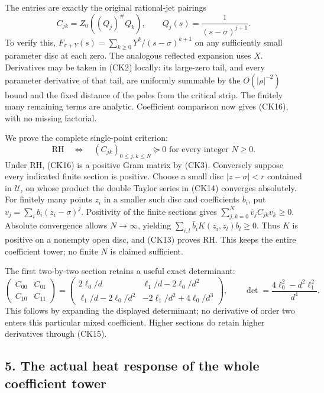 \documentclass[
  10pt,
  a4paper,
]{article}
\newcounter{none} %
\begin{document}
The entries are exactly the original rational-jet pairings \[
C_{jk}=Z_0\!\left((Q_j)^\#Q_k\right),\qquad
Q_j(s)=\frac1{(s-\sigma)^{j+1}}.
\tag{CK16}
\] To verify this, \(F_{\sigma+Y}(s)=\sum_{k\ge0}Y^k/(s-\sigma)^{k+1}\)
on any sufficiently small parameter disc at each zero. The analogous
reflected expansion uses \(X\). Derivatives may be taken in (CK2)
locally: its large-zero tail, and every parameter derivative of that
tail, are uniformly summable by the \(O(|\rho|^{-2})\) bound and the
fixed distance of the poles from the critical strip. The finitely many
remaining terms are analytic. Coefficient comparison now gives (CK16),
with no missing factorial.

We prove the complete single-point criterion: \[
\boxed{\mathrm{RH}\quad\Longleftrightarrow\quad
(C_{jk})_{0\le j,k\le N}\succeq0\text{ for every integer }N\ge0.}
\tag{CK17}
\] Under RH, (CK16) is a positive Gram matrix by (CK3). Conversely
suppose every indicated finite section is positive. Choose a small disc
\(|z-\sigma|<r\) contained in \(\mathcal U\), on whose product the
double Taylor series in (CK14) converges absolutely. For finitely many
points \(z_i\) in a smaller such disc and coefficients \(b_i\), put
\(v_j=\sum_i b_i(z_i-\sigma)^j\). Positivity of the finite sections
gives \(\sum_{j,k=0}^N\bar v_jC_{jk}v_k\ge0\). Absolute convergence
allows \(N\to\infty\), yielding \(\sum_{i,l}\bar b_iK(z_i,z_l)b_l\ge0\).
Thus \(K\) is positive on a nonempty open disc, and (CK13) proves RH.
This keeps the entire coefficient tower; no finite \(N\) is claimed
sufficient.

The first two-by-two section retains a useful exact determinant: \[
\begin{pmatrix}C_{00}&C_{01}\\C_{10}&C_{11}\end{pmatrix}
=\begin{pmatrix}
2\ell_0/d&\ell_1/d-2\ell_0/d^2\\
\ell_1/d-2\ell_0/d^2&-2\ell_1/d^2+4\ell_0/d^3
\end{pmatrix},\qquad
\det=\frac{4\ell_0^2-d^2\ell_1^2}{d^4}.
\tag{CK18}
\] This follows by expanding the displayed determinant; no derivative of
order two enters this particular mixed coefficient. Higher sections do
retain higher derivatives through (CK15).

\subsection{5. The actual heat response of the whole coefficient
tower}\label{the-actual-heat-response-of-the-whole-coefficient-tower}
\end{document}
